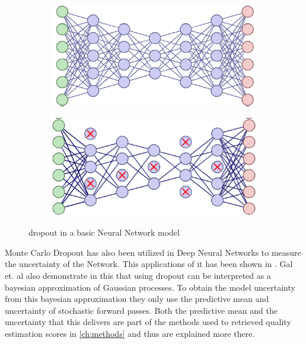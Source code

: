 \begin{figure}[ht]
    \centering
    \begin{subfigure}{0.45\textwidth}
        \includegraphics[width=\linewidth]{Latex//sections//images/nondropout.png}
    \end{subfigure}
    \begin{subfigure}{0.45\textwidth}
        \includegraphics[width=\linewidth]{Latex//sections//images/dropout.png}
    \end{subfigure}
    
    \caption{dropout in a basic Neural Network model}
    \label{fig:dropout}
\end{figure}

Monte Carlo Dropout has also been utilized in Deep Neural Networks to measure the uncertainty of the Network.   
This applications of it has been shown in \cite{gal2016dropoutbayesianapproximationrepresenting}. Gal et. al also demonstrate in this that using dropout can be interpreted as a bayesian approximation of Gaussian processes. To obtain the model uncertainty from this bayesian approximation they only use the predictive mean and uncertainty of stochastic forward passes. Both the predictive mean and the uncertainty that this delivers are part of the methods used to retrieved quality estimation scores in \autoref{ch:methods} and thus are explained more there.

